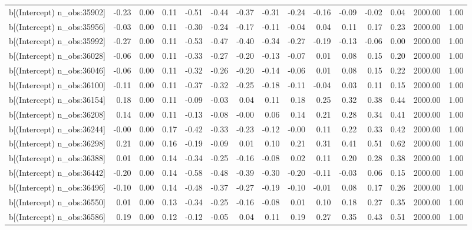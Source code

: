 \begin{table}[ht]
\begin{tabular}{rrrrrrrrrrrrrrr}
  b[(Intercept) n\_obs:35902] & -0.23 & 0.00 & 0.11 & -0.51 & -0.44 & -0.37 & -0.31 & -0.24 & -0.16 & -0.09 & -0.02 & 0.04 & 2000.00 & 1.00 \\ 
  b[(Intercept) n\_obs:35956] & -0.03 & 0.00 & 0.11 & -0.30 & -0.24 & -0.17 & -0.11 & -0.04 & 0.04 & 0.11 & 0.17 & 0.23 & 2000.00 & 1.00 \\ 
  b[(Intercept) n\_obs:35992] & -0.27 & 0.00 & 0.11 & -0.53 & -0.47 & -0.40 & -0.34 & -0.27 & -0.19 & -0.13 & -0.06 & 0.00 & 2000.00 & 1.00 \\ 
  b[(Intercept) n\_obs:36028] & -0.06 & 0.00 & 0.11 & -0.33 & -0.27 & -0.20 & -0.13 & -0.07 & 0.01 & 0.08 & 0.15 & 0.20 & 2000.00 & 1.00 \\ 
  b[(Intercept) n\_obs:36046] & -0.06 & 0.00 & 0.11 & -0.32 & -0.26 & -0.20 & -0.14 & -0.06 & 0.01 & 0.08 & 0.15 & 0.22 & 2000.00 & 1.00 \\ 
  b[(Intercept) n\_obs:36100] & -0.11 & 0.00 & 0.11 & -0.37 & -0.32 & -0.25 & -0.18 & -0.11 & -0.04 & 0.03 & 0.11 & 0.15 & 2000.00 & 1.00 \\ 
  b[(Intercept) n\_obs:36154] & 0.18 & 0.00 & 0.11 & -0.09 & -0.03 & 0.04 & 0.11 & 0.18 & 0.25 & 0.32 & 0.38 & 0.44 & 2000.00 & 1.00 \\ 
  b[(Intercept) n\_obs:36208] & 0.14 & 0.00 & 0.11 & -0.13 & -0.08 & -0.00 & 0.06 & 0.14 & 0.21 & 0.28 & 0.34 & 0.41 & 2000.00 & 1.00 \\ 
  b[(Intercept) n\_obs:36244] & -0.00 & 0.00 & 0.17 & -0.42 & -0.33 & -0.23 & -0.12 & -0.00 & 0.11 & 0.22 & 0.33 & 0.42 & 2000.00 & 1.00 \\ 
  b[(Intercept) n\_obs:36298] & 0.21 & 0.00 & 0.16 & -0.19 & -0.09 & 0.01 & 0.10 & 0.21 & 0.31 & 0.41 & 0.51 & 0.62 & 2000.00 & 1.00 \\ 
  b[(Intercept) n\_obs:36388] & 0.01 & 0.00 & 0.14 & -0.34 & -0.25 & -0.16 & -0.08 & 0.02 & 0.11 & 0.20 & 0.28 & 0.38 & 2000.00 & 1.00 \\ 
  b[(Intercept) n\_obs:36442] & -0.20 & 0.00 & 0.14 & -0.58 & -0.48 & -0.39 & -0.30 & -0.20 & -0.11 & -0.03 & 0.06 & 0.15 & 2000.00 & 1.00 \\ 
  b[(Intercept) n\_obs:36496] & -0.10 & 0.00 & 0.14 & -0.48 & -0.37 & -0.27 & -0.19 & -0.10 & -0.01 & 0.08 & 0.17 & 0.26 & 2000.00 & 1.00 \\ 
  b[(Intercept) n\_obs:36550] & 0.01 & 0.00 & 0.13 & -0.34 & -0.25 & -0.16 & -0.08 & 0.01 & 0.10 & 0.18 & 0.27 & 0.35 & 2000.00 & 1.00 \\ 
  b[(Intercept) n\_obs:36586] & 0.19 & 0.00 & 0.12 & -0.12 & -0.05 & 0.04 & 0.11 & 0.19 & 0.27 & 0.35 & 0.43 & 0.51 & 2000.00 & 1.00 \\ 

\end{tabular}
\end{table}
